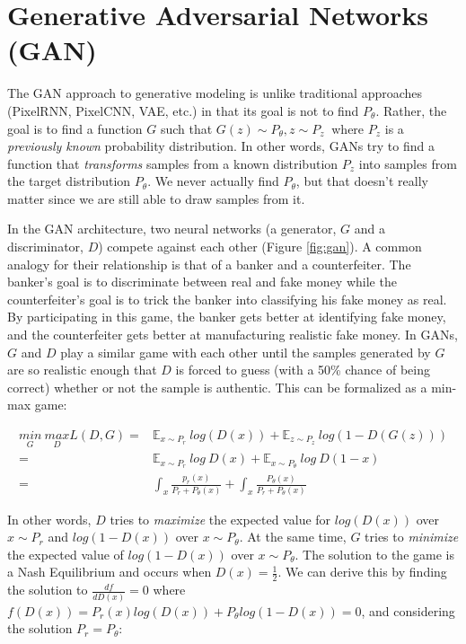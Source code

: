 
\section{Generative Adversarial Networks (GAN)}

The GAN approach to generative modeling is unlike traditional approaches (PixelRNN, PixelCNN, VAE, etc.) in that its goal is not to find $P_\theta$. Rather, the goal is to find a function $G$ such that $G(z) \sim P_\theta, z \sim P_z~$ where $P_z$ is a \textit{previously known} probability distribution. In other words, GANs try to find a function that \textit{transforms} samples from a known distribution $P_z$ into samples from the target distribution $P_\theta$. We never actually find $P_\theta$, but that doesn't really matter since we are still able to draw samples from it. 

In the GAN architecture, two neural networks (a generator, $G$ and a discriminator, $D$) compete against each other (Figure \ref{fig:gan}). A common analogy for their relationship is that of a banker and a counterfeiter. The banker's goal is to discriminate between real and fake money while the counterfeiter's goal is to trick the banker into classifying his fake money as real. By participating in this game, the banker gets better at identifying fake money, and the counterfeiter gets better at manufacturing realistic fake money. In GANs, $G$ and $D$ play a similar game with each other until the samples generated by $G$ are so realistic enough that $D$ is forced to guess (with a 50\% chance of being correct) whether or not the sample is authentic. This can be formalized as a min-max game:

\begin{align}
	\label{eq:minmax}
	\underset{G}{min}~\underset{D}{max} L(D, G) =& \mathbb{E}_{x \sim P_r}~log(D(x)) + \mathbb{E}_{z \sim P_z}~log(1-D(G(z))) \nonumber \\
	=& \mathbb{E}_{x \sim P_r}~log~D(x) + \mathbb{E}_{x \sim P_\theta}~log~D(1-x) \nonumber \\ 
	=& \int_{x}^{} \frac{p_r(x)}{P_r + P_\theta(x)} + \int_{x}^{} \frac{P_\theta(x)}{P_r + P_\theta(x)} 
\end{align}

In other words, $D$ tries to \textit{maximize} the expected value for $log(D(x))$ over $x \sim P_r$ and $log(1-D(x))$ over $x \sim P_\theta$. At the same time, $G$ tries to \textit{minimize} the expected value of $log(1-D(x))$ over $x \sim P_\theta$. The solution to the game is a Nash Equilibrium and occurs when $D(x)=\frac{1}{2}$. We can derive this by finding the solution to $\frac{d f}{d D(x)} = 0$ where $f(D(x)) = P_r(x) log(D(x)) + P_\theta log(1-D(x)) = 0$, and considering the solution $P_r = P_\theta$: 

